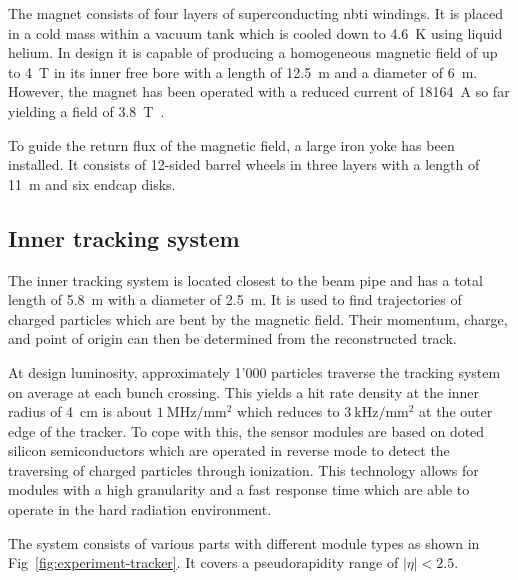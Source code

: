 The magnet consists of four layers of superconducting \gls{nbti} windings. It is placed in a cold mass within a vacuum tank which is cooled down to 4.6~K using liquid helium. In design it is capable of producing a homogeneous magnetic field of up to 4~T in its inner free bore with a length of 12.5~m and a diameter of 6~m. However, the magnet has been operated with a reduced current of 18164~A so far yielding a field of 3.8~T~\cite{Chatrchyan:2009si}. 

To guide the return flux of the magnetic field, a large iron yoke has been installed. It consists of 12-sided barrel wheels in three layers with a length of 11~m and six endcap disks. 

\subsection{Inner tracking system}

The inner tracking system is located closest to the beam pipe and has a total length of 5.8~m with a diameter of 2.5~m. It is used to find trajectories of charged particles which are bent by the magnetic field. Their momentum, charge, and point of origin can then be determined from the reconstructed track. 

At design luminosity, approximately 1'000 particles traverse the tracking system on average at each bunch crossing. This yields a hit rate density at the inner radius of 4~cm is about $1~\mathrm{MHz/mm^2}$ which reduces to $3~\mathrm{kHz/mm^2}$ at the outer edge of the tracker. To cope with this, the sensor modules are based on doted silicon semiconductors which are operated in reverse mode to detect the traversing of charged particles through ionization. This technology allows for modules with a high granularity and a fast response time which are able to operate in the hard radiation environment.

The system consists of various parts with different module types as shown in Fig~\ref{fig:experiment-tracker}. It covers a pseudorapidity range of $|\eta|<2.5$.


